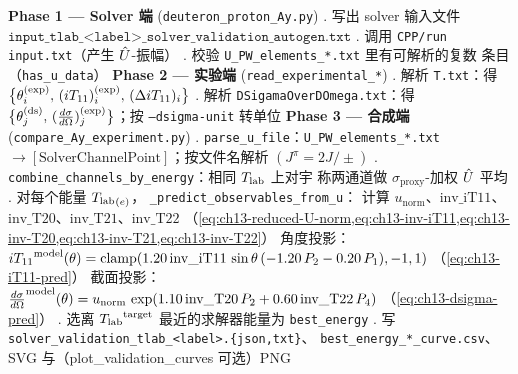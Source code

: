 \begin{algorithm}[H]
\caption{\textsc{Polarization-Observables}\((\Tlab^{\text{target}},
\text{run\_params})\)}
\label{alg:ch13-pol-obs}
\BlankLine
\textbf{Phase 1 — Solver 端} (\texttt{deuteron\_proton\_Ay.py})\;
. 写出 solver 输入文件
\(\texttt{input\_tlab\_<label>\_solver\_validation\_autogen.txt}\)\;
. 调用 \texttt{CPP/run input.txt}（产生 \(\hat{U}\)-振幅）\;
. 校验 \texttt{U\_PW\_elements\_*.txt} 里有可解析的复数
        条目（\texttt{has\_u\_data}）\;
\BlankLine
\textbf{Phase 2 — 实验端} (\texttt{read\_experimental\_*})\;
. 解析 \texttt{T.txt}：得 \(\big\{\theta_i^{(\text{exp})},\,
        ({i T_{11}})_i^{(\text{exp})},\, (\Delta{i T_{11}})_i\big\}\)\;
. 解析 \texttt{DSigamaOverDOmega.txt}：得
        \(\big\{\theta_j^{(\text{ds})},\, (\frac{d\sigma}{d\Omega})_j^{(\text{exp})}\big\}\)；按
        \texttt{--dsigma-unit} 转单位\;
\BlankLine
\textbf{Phase 3 — 合成端} (\texttt{compare\_Ay\_experiment.py})\;
. \texttt{parse\_u\_file}：\texttt{U\_PW\_elements\_*.txt}
        \(\to [\text{SolverChannelPoint}]\)；按文件名解析
        \((J^\pi = 2J/\pm)\)\;
. \texttt{combine\_channels\_by\_energy}：相同 \({T_{\text{lab}}}\) 上对宇
        称两通道做 \(\sigma_{\text{proxy}}\)-加权 \(\hat{U}\) 平均\;
. 对每个能量 \({T_{\text{lab}}}_{(e)}\)，
        \texttt{\_predict\_observables\_from\_u}：\;
 计算 \(u_{\text{norm}}\)、\(\text{inv\_iT11}\)、
            \(\text{inv\_T20}\)、\(\text{inv\_T21}\)、\(\text{inv\_T22}\)
            （\cref{eq:ch13-reduced-U-norm,eq:ch13-inv-iT11,eq:ch13-inv-T20,eq:ch13-inv-T21,eq:ch13-inv-T22}）\;
 角度投影：
            \({i T_{11}}^{\text{model}}(\theta) =
              \mathrm{clamp}(1.20\,\text{inv\_iT11}\,\sin\theta\,
              (-1.20\,P_2 - 0.20\,P_1), -1, 1)\)
            （\cref{eq:ch13-iT11-pred}）\;
 截面投影：
            \(\frac{d\sigma}{d\Omega}^{\text{model}}(\theta) = u_{\text{norm}}\,
              \exp(1.10\,\text{inv\_T20}\,P_2 +
              0.60\,\text{inv\_T22}\,P_4)\)
            （\cref{eq:ch13-dsigma-pred}）\;
. 选离 \({T_{\text{lab}}}^{\text{target}}\) 最近的求解器能量为
        \texttt{best\_energy}\;
. 写 \texttt{solver\_validation\_tlab\_<label>.\{json,txt\}}、
         \texttt{best\_energy\_*\_curve.csv}、SVG 与（plot\_validation\_curves
         可选）PNG\;
\end{algorithm}

